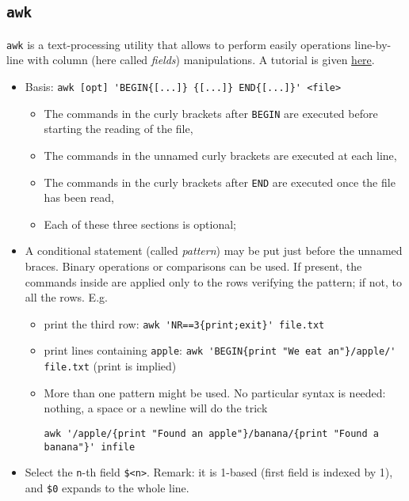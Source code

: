 \documentclass[a4paper,12pt,%
              final%
              ]{article}
\begin{document}
\subsection{\texttt{awk}}
\label{ssec:awk}
\texttt{awk} is a text-processing utility that allows to perform easily operations line-by-line with column (here called \emph{fields}) manipulations. A tutorial is given \href{https://www.tutorialspoint.com/awk/index.htm}{here}.
\begin{itemize}
  \item Basis: \verb|awk [opt] 'BEGIN{[...]} {[...]} END{[...]}' <file>|
    \begin{itemize}
      \item The commands in the curly brackets after \texttt{BEGIN} are executed before starting the reading of the file,
      \item The commands in the unnamed curly brackets are executed at each line,
      \item The commands in the curly brackets after \texttt{END} are executed once the file has been read,
      \item Each of these three sections is optional;
    \end{itemize}
  \item A conditional statement (called \emph{pattern}) may be put just before the unnamed braces. Binary operations or comparisons can be used. If present, the commands inside are applied only to the rows verifying the pattern; if not, to all the rows. E.g.
    \begin{itemize}
      \item print the third row: \verb|awk 'NR==3{print;exit}' file.txt|
      \item print lines containing \texttt{apple}: \verb|awk 'BEGIN{print "We eat an"}/apple/' file.txt| (print is implied)
      \item More than one pattern might be used. No particular syntax is needed: nothing, a space or a newline will do the trick
\begin{verbatim}
awk '/apple/{print "Found an apple"}/banana/{print "Found a banana"}' infile
\end{verbatim}
    \end{itemize}
  \item Select the \texttt{n}-th field \verb|$<n>|. Remark: it is 1-based (first field is indexed by 1), and \verb|$0| expands to the whole line.

\end{itemize}
\end{document}
